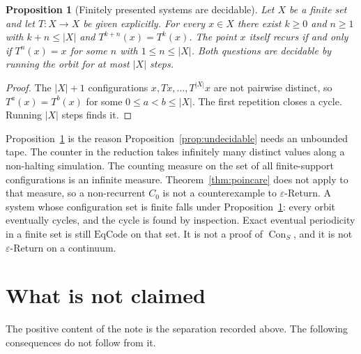 \documentclass[11pt]{article}
\DeclareMathOperator{\Con}{Con}
\newtheorem{proposition}[theorem]{Proposition}
\theoremstyle{definition}
\theoremstyle{remark}
\begin{document}
\begin{proposition}[Finitely presented systems are decidable]
\label{prop:finite}
Let \(X\) be a finite set and let \(T\colon X\to X\) be given explicitly.
For every \(x\in X\) there exist \(k\geq 0\) and \(n\geq 1\) with \(k+n\leq |X|\) and \(T^{k+n}(x)=T^{k}(x)\).
The point \(x\) itself recurs if and only if \(T^{n}(x)=x\) for some \(n\) with \(1\leq n\leq |X|\).
Both questions are decidable by running the orbit for at most \(|X|\) steps.
\end{proposition}

\begin{proof}
The \(|X|+1\) configurations \(x,Tx,\ldots,T^{|X|}x\) are not pairwise distinct, so \(T^{a}(x)=T^{b}(x)\) for some \(0\leq a<b\leq |X|\).
The first repetition closes a cycle.
Running \(|X|\) steps finds it.
\end{proof}

Proposition~\ref{prop:finite} is the reason Proposition~\ref{prop:undecidable} needs an unbounded tape.
The counter in the reduction takes infinitely many distinct values along a non-halting simulation.
The counting measure on the set of all finite-support configurations is an infinite measure.
Theorem~\ref{thm:poincare} does not apply to that measure, so a non-recurrent \(C_0\) is not a counterexample to \(\varepsilon\)-Return.
A system whose configuration set is finite falls under Proposition~\ref{prop:finite}: every orbit eventually cycles, and the cycle is found by inspection.
Exact eventual periodicity in a finite set is still \(\mathrm{EqCode}\) on that set.
It is not a proof of \(\Con_{S}\), and it is not \(\varepsilon\)-Return on a continuum.

\section{What is not claimed}
\label{sec:not}

The positive content of the note is the separation recorded above.
The following consequences do not follow from it.
\end{document}
